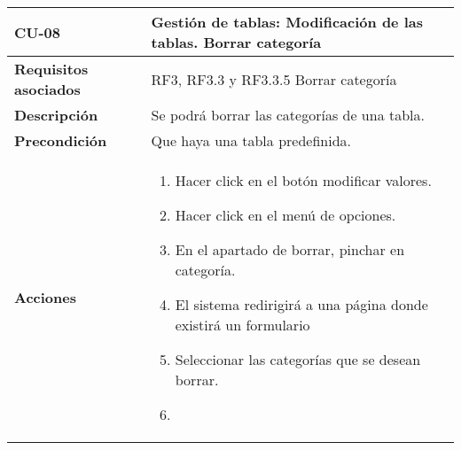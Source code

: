 \newpage
\begin{longtable}[H]{@{}ll@{}}
\toprule
\begin{minipage}[b]{0.23\columnwidth}\raggedright\strut
\textbf{CU-08}\strut
\end{minipage} & \begin{minipage}[b]{0.71\columnwidth}\raggedright\strut
\textbf{Gestión de tablas: Modificación de las tablas. Borrar categoría}\strut
\end{minipage}\tabularnewline
\midrule
\endhead
\begin{minipage}[t]{0.23\columnwidth}\raggedright\strut
\textbf{Requisitos asociados}\strut
\end{minipage} & \begin{minipage}[t]{0.71\columnwidth}\raggedright\strut
RF3, RF3.3 y RF3.3.5 Borrar categoría\strut
\end{minipage}\tabularnewline
\begin{minipage}[t]{0.23\columnwidth}\raggedright\strut
\textbf{Descripción}\strut
\end{minipage} & \begin{minipage}[t]{0.71\columnwidth}\raggedright\strut
Se podrá borrar las categorías de una tabla.
\strut
\end{minipage}\tabularnewline
\begin{minipage}[t]{0.23\columnwidth}\raggedright\strut
\textbf{Precondición}\strut
\end{minipage} & \begin{minipage}[t]{0.71\columnwidth}\raggedright\strut
Que haya una tabla predefinida.\strut
\end{minipage}\tabularnewline
\begin{minipage}[t]{0.23\columnwidth}\raggedright\strut
\textbf{Acciones}\strut
\end{minipage} & \begin{minipage}[t]{0.71\columnwidth}\raggedright\strut
\begin{enumerate}
\def\labelenumi{\arabic{enumi}.}
\tightlist
\item
Hacer click en el botón modificar valores.
\item
Hacer click en el menú de opciones.
\item
En el apartado de borrar, pinchar en categoría.
\item
El sistema redirigirá a una página donde existirá un formulario
\item 
Seleccionar las categorías que se desean borrar.
\item

\end{enumerate}
\end{minipage}
\end{longtable}
